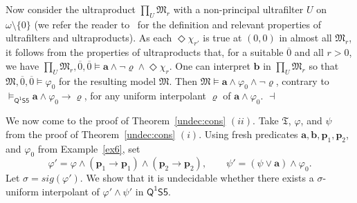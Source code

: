 \documentclass{lmcs} %
\theoremstyle{plain}\newtheorem{satz}[thm]{Satz} %
\newcommand{\sig}{\mathit{sig}}
\newcommand{\tiling}{\mathfrak T}
\newcommand{\FOMS}{\ensuremath{\mathsf{Q^1S5}}}
\newcommand{\fform}[1]{\boldsymbol{#1}}
\newcommand{\pvar}{\fform{p}}
\newcommand{\avar}{\fform{a}}
\newcommand{\bvar}{\fform{b}}
\newcommand{\ovar}{\fform{o}}
\newcommand{\Bv}{\forall}
\newcommand{\Bh}{\Box}
\begin{document}
\begin{exa}
	Now consider the ultraproduct $\prod_{U}\mathfrak{M}_{r}$ with a non-principal ultrafilter $U$ on $\omega\setminus\{0\}$ (we refer the reader to~\cite{modeltheory} for the definition and relevant properties of ultrafilters and ultraproducts). As each $\Diamond \chi_{r'}$ is true at $(0,0)$ in almost all $\mathfrak{M}_{r}$, it follows from the properties of ultraproducts that, for a suitable $\overline{0}$ and all $r>0$, we have
$
\prod_{U}\mathfrak{M}_{r},\overline{0},\overline{0}\models \avar \land \neg \varrho \land \Diamond \chi_{r}.
$ 
One can interpret $\bvar$ in $\prod_{U}\mathfrak{M}_{r}$ so that  
	$\mathfrak{M},\overline{0},\overline{0}\models \varphi_{0}$ for the resulting model $\mathfrak{M}$. Then $\mathfrak{M}\models \avar \wedge \varphi_{0} \wedge \neg \varrho$, contrary to $\models_\FOMS\avar\land\varphi_0\to\varrho$, for any uniform interpolant $\varrho$ of $\avar\land\varphi_0$. \hfill $\dashv$
\end{exa}

We now come to the proof of Theorem~\ref{undec:cons} $(ii)$.
	Take $\tiling$, $\varphi$, and $\psi$ from the proof of Theorem~\ref{undec:cons} $(i)$. Using fresh predicates $\avar, \bvar, \pvar_{1},\pvar_{2}$, and $\varphi_{0}$ from Example~\ref{ex6},  set
		$$
		\varphi' =  \varphi\land (\pvar_{1}\rightarrow \pvar_{1})\land (\pvar_{2}\rightarrow \pvar_{2}),\qquad
		\psi' =  (\psi \vee \avar) \wedge \varphi_{0}.
		$$
		Let $\sigma= \sig(\varphi')$. 
		We show that it is undecidable whether there exists a $\sigma$-uniform interpolant of $\varphi' \wedge \psi'$ in $\FOMS$.
		
\end{document}
